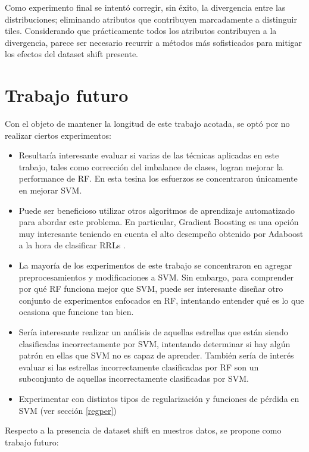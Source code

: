 Como experimento final se intentó corregir, sin éxito, la divergencia entre las distribuciones; eliminando atributos que contribuyen marcadamente a distinguir tiles. Considerando que prácticamente todos los atributos contribuyen a la divergencia, parece ser necesario recurrir a métodos más sofisticados para mitigar los efectos del dataset shift presente. \\

\section{Trabajo futuro}
\label{tfuturo}
Con el objeto de mantener la longitud de este trabajo acotada, se optó por no realizar ciertos experimentos: 

\begin{itemize}
\item Resultaría interesante evaluar si varias de las técnicas aplicadas en este trabajo, tales como corrección del imbalance de clases, logran mejorar la performance de RF. En esta tesina los esfuerzos se concentraron únicamente en mejorar SVM.
\item Puede ser beneficioso utilizar otros algoritmos de aprendizaje automatizado para abordar este problema. En particular, Gradient Boosting \cite{friedman2000greedy} \cite{friedman2} es una opción muy interesante teniendo en cuenta el alto desempeño obtenido por Adaboost a la hora de clasificar RRLs \cite{elorrieta}.
\item La mayoría de los experimentos de este trabajo se concentraron en agregar preprocesamientos y modificaciones a SVM. Sin embargo, para comprender por qué RF funciona mejor que SVM, puede ser interesante diseñar otro conjunto de experimentos enfocados en RF, intentando entender qué es lo que ocasiona que funcione tan bien.
\item Sería interesante realizar un análisis de aquellas estrellas que están siendo clasificadas incorrectamente por SVM, intentando determinar si hay algún patrón en ellas que SVM no es capaz de aprender. También sería de interés evaluar si las estrellas incorrectamente clasificadas por RF son un subconjunto de aquellas incorrectamente clasificadas por SVM.
\item Experimentar con distintos tipos de regularización y funciones de pérdida en SVM (ver sección \ref{regper})
\end{itemize}

Respecto a la presencia de dataset shift en nuestros datos, se propone como trabajo futuro:

